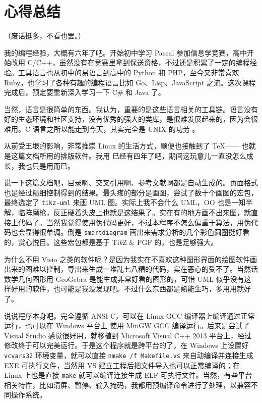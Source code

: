 \section{心得总结}

（废话挺多，不看也罢。）

我的编程经验，大概有六年了吧。开始初中学习 Pascal 参加信息学竞赛，高中开始改用 C/C++，虽然没有在竞赛里拿到保送资格，不过还是积累了一定的编程经验。工具语言也从初中的易语言到高中的 Python 和 PHP，至今又非常喜欢 Ruby，也学习了各种有趣的编程语言比如 Go、Lisp、JavaScript 之流。这次课程完成后，预定要重新深入学习一下 C\# 和 Java 了。

当然，语言是很简单的东西。我认为，重要的是这些语言相关的工具链。语言没有好的生态环境和社区支持，没有优秀的强大的类库，是很难发展起来的，因为会很难用。C 语言之所以能走到今天，其实完全是 UNIX 的功劳 \cite{krc_c}。

从前受王垠\cite{wylinux}的影响，非常推崇 Linux 的生活方式，顺便也接触到了 \TeX —— 也就是这篇文档所用的排版软件。我用 \LaTeXe 已经有四年了吧，期间这玩意儿一直没怎么成长，我也只是用而已。

说一下这篇文档吧，目录啊、交叉引用啊、参考文献啊都是自动生成的。页面格式也是经过精细控制得到的结果。最头疼的部分是画图，尝试了数十个画图的宏包，最终选定了 \verb+tikz-uml+ 来画 UML 图。实际上我不会什么 UML，OO 也是一知半解，临阵磨枪，反正硬着头皮上也就是这结果了。实在有的地方画不出来图，就直接上代码了。当然我觉得使用伪代码更好，不过本程序不怎么偏重于算法，用伪代码也会显得很单调。倒是 \verb+smartdiagram+ 画出来需求分析的几个彩色圆圈挺好看的，赏心悦目。这些宏包都是基于 Ti{\it k}Z \& PGF 的，也是足够强大。

为什么不用 Visio 之类的软件呢？是因为我实在不喜欢这种图形界面的绘图软件画出来的图难以控制，导出来生成一堆乱七八糟的代码，实在恶心的受不了。当然话数学几何图形用 GeoGebra 是能生成非常好看的图形的，可惜 UML 似乎没有这样好用的软件，也可能是我没发现吧。不过什么东西都是熟能生巧，多用用就好了。

说说程序本身吧。完全遵循 ANSI C，可以在 Linux GCC 编译器上编译通过正常运行，也可以在 Windows 平台上 使用 MinGW GCC 编译运行。后来是尝试了 Visual Studio 感觉很好用，就移植到 Microsoft Visual C++ 2013 平台上，经过修改终于可以完美运行。于是这个程序就是跨平台的了，在 Windows 上设置好 \verb+vcvars32+ 环境变量，就可以直接 \verb+nmake /f Makefile.vs+ 来自动编译并连接生成 EXE 可执行文件，当然用 VS 建立工程后把文件导入也可以正常编译的；在 Linux 上也是直接 \verb+make+ 就可以编译连接生成 ELF 可执行文件。当然，有些平台相关特性，比如清屏、暂停、输入掩码，我都用预编译命令进行了处理，以兼容不同操作系统。

